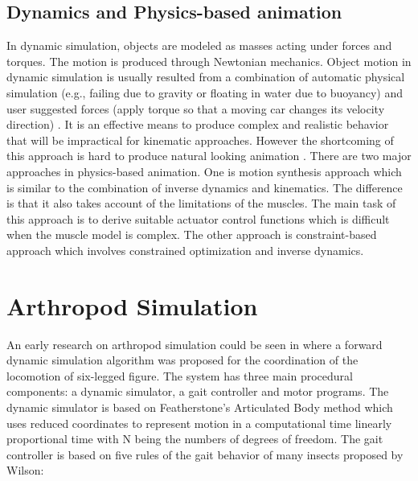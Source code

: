 \subsection{Dynamics and Physics-based animation}
In dynamic simulation, objects are modeled as masses acting under
forces and torques. The motion is produced through Newtonian
mechanics. Object motion in dynamic simulation is usually resulted
from a combination of automatic physical simulation (e.g., failing due
to gravity or floating in water due to buoyancy) and user suggested
forces (apply torque so that a moving car changes its velocity
direction) \cite{dy1}. It is an effective means to produce complex and
realistic behavior that will be impractical for kinematic
approaches. However the shortcoming of this approach is hard to
produce natural looking animation \cite{dy2}. 
There are two major approaches in physics-based animation. One is
motion synthesis approach which is similar to the combination of
inverse dynamics and kinematics. The difference is that it also takes
account of the limitations of the muscles. The main task of this
approach is to derive suitable actuator control functions which is
difficult when the muscle model is complex. The other approach is
constraint-based approach which involves constrained optimization and
inverse dynamics. 
\section{Arthropod Simulation}
An early research on arthropod simulation could be seen in \cite{arsimu1} where a
forward dynamic simulation algorithm was proposed for the coordination
of the locomotion of six-legged figure. The system has three main
procedural components: a dynamic simulator, a gait controller and
motor programs. The dynamic simulator is based on Featherstone's
Articulated Body method which uses reduced coordinates to represent
motion in a computational time linearly proportional time with N being
the numbers of degrees of freedom. The gait controller is based on five rules of
the gait behavior of many insects proposed by Wilson\cite{arsimu2}: 

